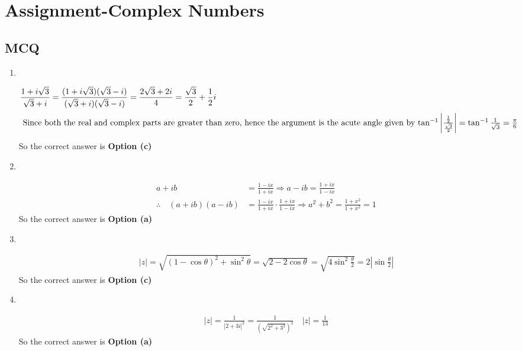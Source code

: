 \chapter{Assignment-Complex Numbers}
\section{MCQ}
\begin{enumerate}
	\item $\left. \right. $
	\begin{answer}
		\begin{align*}
	\frac{1+i \sqrt{3}}{\sqrt{3}+i}&=\frac{(1+i \sqrt{3})(\sqrt{3}-i)}{(\sqrt{3}+i)(\sqrt{3}-i)}=\frac{2 \sqrt{3}+2 i}{4}=\frac{\sqrt{3}}{2}+\frac{1}{2} i\\
\intertext{	Since both the real and complex parts are greater than zero, hence the argument is the acute angle given by $\tan ^{-1}\left|\frac{\frac{1}{2}}{\frac{\sqrt{3}}{2}}\right|=\tan ^{-1} \frac{1}{\sqrt{3}}=\frac{\pi}{6}$}
		\end{align*}
		So the correct answer is \textbf{Option (c)}
	\end{answer}
\item $\left. \right. $	
	\begin{answer}
		\begin{align*}
		a+i b&=\frac{1-i x}{1+i x} \Rightarrow a-i b=\frac{1+i x}{1-i x}\\
		\therefore \quad(a+i b)(a-i b)&=\frac{1-i x}{1+i x} \cdot \frac{1+i x}{1-i x} \Rightarrow a^{2}+b^{2}=\frac{1+x^{2}}{1+x^{2}}=1
		\end{align*}
		So the correct answer is \textbf{Option (a)}
	\end{answer}
\item $\left. \right. $	
	\begin{answer}
		\begin{align*}
		|z|=\sqrt{(1-\cos \theta)^{2}+\sin ^{2} \theta}=\sqrt{2-2 \cos \theta}=\sqrt{4 \sin ^{2} \frac{\theta}{2}}=2\left|\sin \frac{\theta}{2}\right|
		\end{align*}
		So the correct answer is \textbf{Option (c)}
	\end{answer}
\item $\left. \right. $		
	\begin{answer}
		\begin{align*}
		|z|=\frac{1}{|2+3 i|^{2}}=\frac{1}{\left(\sqrt{2^{2}+3^{2}}\right)^{2}} \quad|z|=\frac{1}{13}
		\end{align*}
		So the correct answer is \textbf{Option (a)}

\end{answer}
\end{enumerate}
